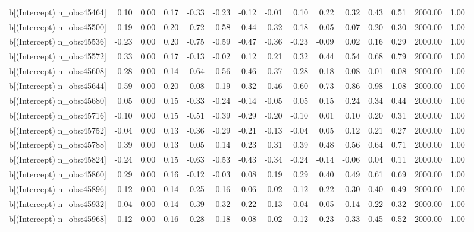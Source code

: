 \begin{table}[ht]
\begin{tabular}{rrrrrrrrrrrrrrr}
  b[(Intercept) n\_obs:45464] & 0.10 & 0.00 & 0.17 & -0.33 & -0.23 & -0.12 & -0.01 & 0.10 & 0.22 & 0.32 & 0.43 & 0.51 & 2000.00 & 1.00 \\ 
  b[(Intercept) n\_obs:45500] & -0.19 & 0.00 & 0.20 & -0.72 & -0.58 & -0.44 & -0.32 & -0.18 & -0.05 & 0.07 & 0.20 & 0.30 & 2000.00 & 1.00 \\ 
  b[(Intercept) n\_obs:45536] & -0.23 & 0.00 & 0.20 & -0.75 & -0.59 & -0.47 & -0.36 & -0.23 & -0.09 & 0.02 & 0.16 & 0.29 & 2000.00 & 1.00 \\ 
  b[(Intercept) n\_obs:45572] & 0.33 & 0.00 & 0.17 & -0.13 & -0.02 & 0.12 & 0.21 & 0.32 & 0.44 & 0.54 & 0.68 & 0.79 & 2000.00 & 1.00 \\ 
  b[(Intercept) n\_obs:45608] & -0.28 & 0.00 & 0.14 & -0.64 & -0.56 & -0.46 & -0.37 & -0.28 & -0.18 & -0.08 & 0.01 & 0.08 & 2000.00 & 1.00 \\ 
  b[(Intercept) n\_obs:45644] & 0.59 & 0.00 & 0.20 & 0.08 & 0.19 & 0.32 & 0.46 & 0.60 & 0.73 & 0.86 & 0.98 & 1.08 & 2000.00 & 1.00 \\ 
  b[(Intercept) n\_obs:45680] & 0.05 & 0.00 & 0.15 & -0.33 & -0.24 & -0.14 & -0.05 & 0.05 & 0.15 & 0.24 & 0.34 & 0.44 & 2000.00 & 1.00 \\ 
  b[(Intercept) n\_obs:45716] & -0.10 & 0.00 & 0.15 & -0.51 & -0.39 & -0.29 & -0.20 & -0.10 & 0.01 & 0.10 & 0.20 & 0.31 & 2000.00 & 1.00 \\ 
  b[(Intercept) n\_obs:45752] & -0.04 & 0.00 & 0.13 & -0.36 & -0.29 & -0.21 & -0.13 & -0.04 & 0.05 & 0.12 & 0.21 & 0.27 & 2000.00 & 1.00 \\ 
  b[(Intercept) n\_obs:45788] & 0.39 & 0.00 & 0.13 & 0.05 & 0.14 & 0.23 & 0.31 & 0.39 & 0.48 & 0.56 & 0.64 & 0.71 & 2000.00 & 1.00 \\ 
  b[(Intercept) n\_obs:45824] & -0.24 & 0.00 & 0.15 & -0.63 & -0.53 & -0.43 & -0.34 & -0.24 & -0.14 & -0.06 & 0.04 & 0.11 & 2000.00 & 1.00 \\ 
  b[(Intercept) n\_obs:45860] & 0.29 & 0.00 & 0.16 & -0.12 & -0.03 & 0.08 & 0.19 & 0.29 & 0.40 & 0.49 & 0.61 & 0.69 & 2000.00 & 1.00 \\ 
  b[(Intercept) n\_obs:45896] & 0.12 & 0.00 & 0.14 & -0.25 & -0.16 & -0.06 & 0.02 & 0.12 & 0.22 & 0.30 & 0.40 & 0.49 & 2000.00 & 1.00 \\ 
  b[(Intercept) n\_obs:45932] & -0.04 & 0.00 & 0.14 & -0.39 & -0.32 & -0.22 & -0.13 & -0.04 & 0.05 & 0.14 & 0.22 & 0.32 & 2000.00 & 1.00 \\ 
  b[(Intercept) n\_obs:45968] & 0.12 & 0.00 & 0.16 & -0.28 & -0.18 & -0.08 & 0.02 & 0.12 & 0.23 & 0.33 & 0.45 & 0.52 & 2000.00 & 1.00 \\ 

\end{tabular}
\end{table}
